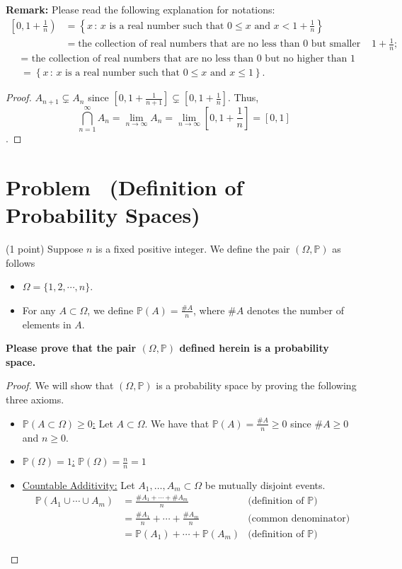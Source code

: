\documentclass[11pt]{article}
\newcounter{pppp}
\newcommand{\prob}{\arabic{pppp}} %
\newcommand{\increase}{\addtocounter{pppp}{1}} %
\newcommand{\newproblem}[2]{
    \increase
    \section*{Problem \prob~(#1) \hfill {#2}}
}
\newcommand{\p}{\mathbb{P}}
\renewcommand{\to}{\rightarrow}
\begin{document}
\begin{enumerate}
\noindent\textbf{Remark:} Please read the following explanation for notations:
\begin{align*}
\left[0,1+\frac{1}{n}\right)&=\left\{x\,:\, x\mbox{ is a real number such that }0\le x \mbox{ and }x<1+\frac{1}{n}\right\}\\
&= \mbox{the collection of real numbers that are no less than 0 but smaller than }1+\frac{1}{n};
\end{align*}
\begin{align*}
[0,1]&=\mbox{ the collection of real numbers that are no less than 0 but no higher than 1} \\
&=\left\{x\,:\, x\mbox{ is a real number such that }0\le x \mbox{ and }x\le 1\right\}.
\end{align*}
\end{enumerate}

\begin{proof}
  \(A_{n+1}\subsetneq A_n\)
  since \([0,1+\frac{1}{n+1}]\subsetneq [0,1+\frac{1}{n}]\). Thus,
  \[\bigcap_{n=1}^\infty A_n = \lim_{n\to\infty} A_n = \lim_{n\to\infty} [0, 1+\frac{1}{n}] = [0,1]\].
\end{proof}

\newproblem{Definition of Probability Spaces}{}

(1 point) Suppose $n$ is a fixed positive integer. We define the pair $(\Omega,\mathbb{P})$ as follows
\begin{itemize}
\item $\Omega=\{1,2,\cdots,n\}$.
\item For any $A\subset \Omega$, we define $\mathbb{P}(A)=\frac{\# A}{n}$, where $\# A$ denotes the number of elements in $A$.
\end{itemize}
\textbf{Please prove that the pair $(\Omega,\mathbb{P})$ defined herein is a probability space. }

\begin{proof}
  We will show that \((\Omega,\p)\) is a probability space by proving the following three axioms.
  \begin{itemize}
    \item \underline{\(\p(A\subset\Omega)\geq 0\):} Let \(A\subset \Omega\). We have that \(\p(A)=\frac{\#A}{n}\geq 0\) since
    \(\#A\geq 0\) and \(n\geq 0\).
    \item \underline{\(\p(\Omega)=1  \):} \(\p(\Omega)=\frac{n}{n}=1\)
    \item \underline{Countable Additivity:} Let \(A_1,\ldots,A_m\subset\Omega\) be mutually disjoint events.
    \begin{align*}
      \p(A_1\cup\cdots\cup A_m) &= \frac{\#A_1+\cdots+\#A_m}{n} & \text{(definition of \(\p\))}\\
      &= \frac{\#A_1}{n}+\cdots+\frac{\#A_m}{n} & \text{(common denominator)}\\
      &= \p(A_1)+\cdots+\p(A_m) & \text{(definition of \(\p\))}
    \end{align*}
  \end{itemize}
\end{proof}
\end{document}
